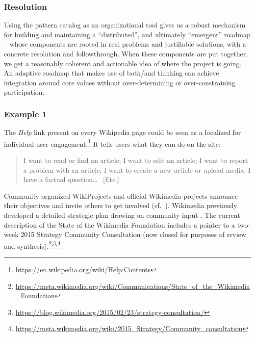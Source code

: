 \subsubsection*{Resolution}
Using the pattern catalog as an
organizational tool gives us a robust mechanism for
building and maintaining a ``distributed'', and ultimately
``emergent'' roadmap -- whose components are rooted in real problems
and justifiable solutions, with a concrete resolution and
followthrough.  When these components are put together, we get a
reasonably coherent and actionable idea of where the project is going.
%
An adaptive roadmap that makes use of both/and thinking can achieve
integration around core values without over-determining or
over-constraining participation.

\subsubsection*{Example 1}  The \emph{Help} link present on every Wikipedia page could be seen as a
localized  for individual user
engagement.\footnote{\url{https://en.wikipedia.org/wiki/Help:Contents}}
It tells users what they can do on the site:

\begin{quotation}
\noindent 
I want to read or find an article;
I want to edit an article;
I want to report a problem with an article;
I want to create a new article or upload media;
I have a factual question\ldots
~[Etc.]
\end{quotation}

Community-organized WikiProjects and official Wikimedia projects announce their objectives  and invite others to get involved (cf.~).  Wikimedia previously developed
a detailed strategic plan drawing on community input
\cite{wikimedia2011plan}.  The current description of the State of
the Wikimedia Foundation includes a pointer to a two-week 2015
Strategy Community Consultation (now closed for purposes of
review and synthesis).\footnote{\url{https://meta.wikimedia.org/wiki/Communications/State_of_the_Wikimedia_Foundation}}\textsuperscript{,}\footnote{\url{https://blog.wikimedia.org/2015/02/23/strategy-consultation/}}\textsuperscript{,}\footnote{\url{https://meta.wikimedia.org/wiki/2015_Strategy/Community_consultation}}

